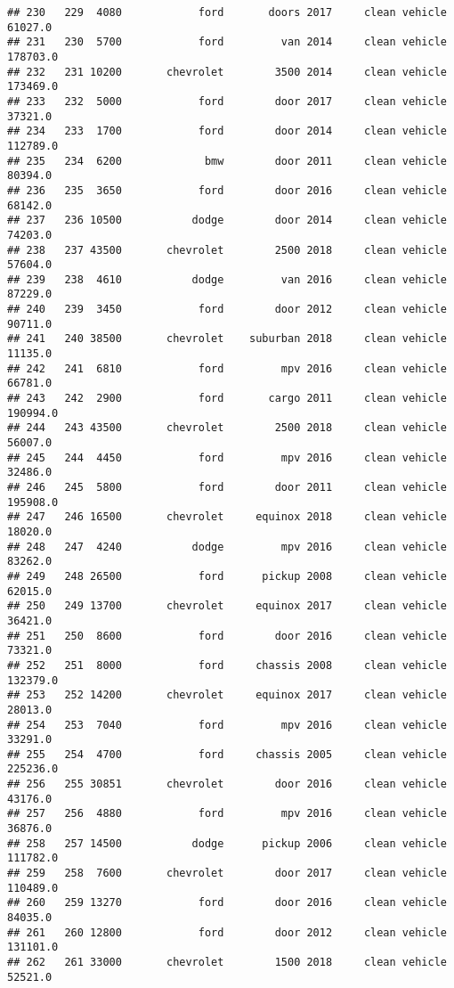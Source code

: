 \documentclass[
]{article}
\begin{document}
\begin{verbatim}
## 230   229  4080            ford       doors 2017     clean vehicle   61027.0
## 231   230  5700            ford         van 2014     clean vehicle  178703.0
## 232   231 10200       chevrolet        3500 2014     clean vehicle  173469.0
## 233   232  5000            ford        door 2017     clean vehicle   37321.0
## 234   233  1700            ford        door 2014     clean vehicle  112789.0
## 235   234  6200             bmw        door 2011     clean vehicle   80394.0
## 236   235  3650            ford        door 2016     clean vehicle   68142.0
## 237   236 10500           dodge        door 2014     clean vehicle   74203.0
## 238   237 43500       chevrolet        2500 2018     clean vehicle   57604.0
## 239   238  4610           dodge         van 2016     clean vehicle   87229.0
## 240   239  3450            ford        door 2012     clean vehicle   90711.0
## 241   240 38500       chevrolet    suburban 2018     clean vehicle   11135.0
## 242   241  6810            ford         mpv 2016     clean vehicle   66781.0
## 243   242  2900            ford       cargo 2011     clean vehicle  190994.0
## 244   243 43500       chevrolet        2500 2018     clean vehicle   56007.0
## 245   244  4450            ford         mpv 2016     clean vehicle   32486.0
## 246   245  5800            ford        door 2011     clean vehicle  195908.0
## 247   246 16500       chevrolet     equinox 2018     clean vehicle   18020.0
## 248   247  4240           dodge         mpv 2016     clean vehicle   83262.0
## 249   248 26500            ford      pickup 2008     clean vehicle   62015.0
## 250   249 13700       chevrolet     equinox 2017     clean vehicle   36421.0
## 251   250  8600            ford        door 2016     clean vehicle   73321.0
## 252   251  8000            ford     chassis 2008     clean vehicle  132379.0
## 253   252 14200       chevrolet     equinox 2017     clean vehicle   28013.0
## 254   253  7040            ford         mpv 2016     clean vehicle   33291.0
## 255   254  4700            ford     chassis 2005     clean vehicle  225236.0
## 256   255 30851       chevrolet        door 2016     clean vehicle   43176.0
## 257   256  4880            ford         mpv 2016     clean vehicle   36876.0
## 258   257 14500           dodge      pickup 2006     clean vehicle  111782.0
## 259   258  7600       chevrolet        door 2017     clean vehicle  110489.0
## 260   259 13270            ford        door 2016     clean vehicle   84035.0
## 261   260 12800            ford        door 2012     clean vehicle  131101.0
## 262   261 33000       chevrolet        1500 2018     clean vehicle   52521.0

\end{verbatim}
\end{document}
